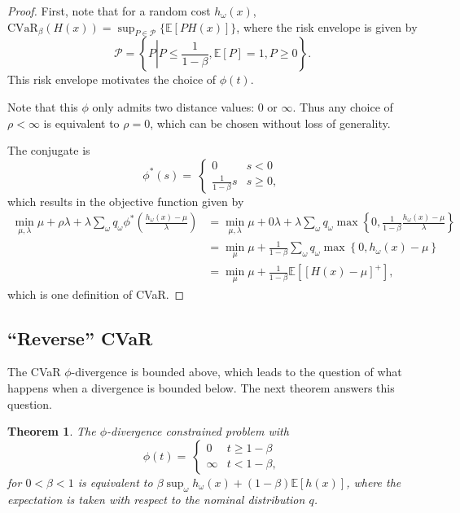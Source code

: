 \documentclass[11pt]{article}
\newcommand{\E}{\mathbb{E}}
\newcommand{\e}[1]{\E \left[ #1 \right]}
\newtheorem{theorem}{Theorem}
\begin{document}
\begin{proof}
	First, note that for a random cost $h_\omega(x)$, $\mbox{CVaR}_\beta(H(x)) = \sup_{P \in \mathcal{P}} \{\e{PH(x)}\}$, where the risk envelope is given by
	\[
		\mathcal{P} = \left\{ P \left| P \leq \frac{1}{1-\beta}, \e{P} = 1, P \geq 0 \right.\right\}.
	\]
	This risk envelope motivates the choice of $\phi(t)$.
	
	Note that this $\phi$ only admits two distance values: $0$ or $\infty$.
	Thus any choice of $\rho < \infty$ is equivalent to $\rho = 0$, which can be chosen without loss of generality.
	
	The conjugate is
	\[
	\phi^*(s) = \
		\begin{cases}
			0 & s < 0 \\
			\frac{1}{1-\beta} s & s \geq 0,
		\end{cases}
	\]
	which results in the objective function given by
	\begin{align*}
		\min_{\mu,\lambda} \mu + \rho \lambda + \lambda \sum_\omega q_\omega \phi^*\left( \frac{h_\omega(x)-\mu}{\lambda} \right) & = \min_{\mu,\lambda} \mu + 0\lambda + \lambda \sum_\omega q_\omega \max\left\{ 0, \frac{1}{1-\beta} \frac{h_\omega(x)-\mu}{\lambda} \right\} \\
		& = \min_{\mu} \mu + \frac{1}{1-\beta} \sum_\omega q_\omega \max\left\{ 0, h_\omega(x)-\mu \right\} \\
		& = \min_{\mu} \mu + \frac{1}{1-\beta} \e{[H(x)-\mu]^+},
	\end{align*}
	which is one definition of CVaR.
\end{proof}

\subsection{``Reverse'' CVaR}

The CVaR $\phi$-divergence is bounded above, which leads to the question of what happens when a divergence is bounded below.
The next theorem answers this question.

\begin{theorem} \label{thm:reverse_cvar}
	The $\phi$-divergence constrained problem with
	\[
		\phi(t) = \
		\begin{cases}
			0 & t \geq 1-\beta \\
			\infty & t < 1-\beta,
		\end{cases}
	\]
	for $0 < \beta < 1$ is equivalent to $\beta \sup_\omega h_\omega(x) + (1-\beta)\e{h(x)}$, where the expectation is taken with respect to the nominal distribution $q$.
\end{theorem}
\end{document}
